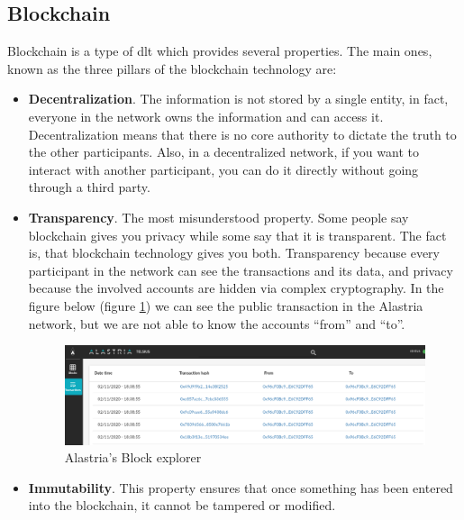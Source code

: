 \documentclass[a4paper, 12pt]{article} %
\begin{document}
    \subsection{Blockchain}
        Blockchain\cite{Bitcoin2015}\cite{blockchain-hype}\cite{blockchain-tech} is a type of \acrfull{dlt} which provides several properties. The main ones, known as the three pillars of the blockchain technology are:
        \begin{itemize}
            \item \textbf{Decentralization}. The information is not stored by a single entity, in fact, everyone in the network owns the information and can access it. Decentralization means that there is no core authority to dictate the truth to the other participants. Also, in a decentralized network, if you want to interact with another participant, you can do it directly without going through a third party.
            \item \textbf{Transparency}. The most misunderstood property. Some people say blockchain gives you privacy while some say that it is transparent. The fact is, that blockchain technology gives you both. Transparency because every participant in the network can see the transactions and its data, and privacy because the involved accounts are hidden via complex cryptography. In the figure below (figure \ref{fig:alastria_block_explorer}) we can see the public transaction in the Alastria network, but we are not able to know the accounts “from” and “to”.
            \begin{figure}[h]
                \centering
                \includegraphics[width=1.1\textwidth]{Alastria-block-exporer.png}
                \caption{Alastria's Block explorer}
                \label{fig:alastria_block_explorer}
            \end{figure}
            \item \textbf{Immutability}. This property ensures that once something has been entered into the blockchain, it cannot be tampered or modified.
        \end{itemize}
        
\end{document}
